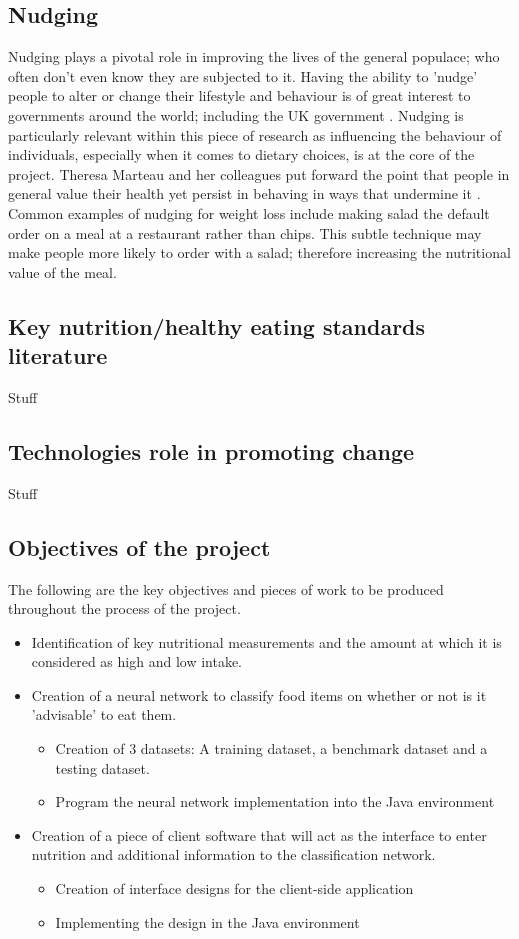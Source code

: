 \documentclass[11pt]{article}
\begin{document}
	\subsection{Nudging}
	Nudging plays a pivotal role in improving the lives of the general populace; who often don't even know they are subjected to it. Having the ability to 'nudge' people to 	alter or change their lifestyle and behaviour is of great interest to governments 			around the world; including the UK government \citep{regulating2011judging}. Nudging is particularly relevant within this piece of research as influencing the 			behaviour of individuals, especially when it comes to dietary choices, is at the core 		of the project. Theresa Marteau and her colleagues put forward the point that people in general value their health yet persist in behaving in ways that undermine it \cite{regulating2011judging}. Common examples of nudging for weight loss include making salad the default order on a meal at a restaurant rather than chips. This subtle technique may make people more likely to order with a salad; therefore increasing the nutritional value of the meal.
	\subsection{Key nutrition/healthy eating standards literature}
	Stuff
	\subsection{Technologies role in promoting change}
	Stuff
	\subsection{Objectives of the project}
	The following are the key objectives and pieces of work to be produced throughout the process of the project.
	\begin{itemize}
		\item Identification of key nutritional measurements and the amount at which it is considered as high and low intake.
		\item Creation of a neural network to classify food items on whether or not is it 'advisable' to eat them.
		\begin{itemize}
			\item Creation of 3 datasets: A training dataset, a benchmark dataset and a testing dataset.
			\item Program the neural network implementation into the Java environment 
		\end{itemize}
		\item Creation of a piece of client software that will act as the interface to enter nutrition and additional information to the classification network.
		\begin{itemize}
			\item Creation of interface designs for the client-side application
			\item Implementing the design in the Java environment
		\end{itemize}
	\end{itemize}
\pagebreak
\end{document}
